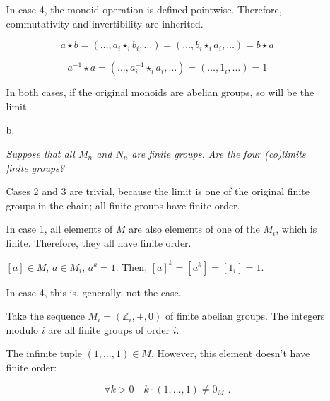 \documentclass[a4paper,notitlepage]{article}
\begin{document}
\begin{enumerate}
\begin{enumerate}
         In case 4, the monoid operation is defined pointwise.
         Therefore, commutativity and invertibility are inherited.

         $$a \star b = (…, a_i \star_i b_i, …) = (…, b_i \star_i a_i, …) = b \star a$$
         
         $$a^{-1} \star a = (…, a_i^{-1} \star_i a_i, …) = (…, 1_i, …) = 1$$

         In both cases, if the original monoids are abelian groups, so
         will be the limit.

       \item[b.]

         {\em Suppose that all $M_n$ and $N_n$ are finite groups.
           Are the four (co)limits finite groups?}

         Cases 2 and 3 are trivial, because the limit is one of the
         original finite groups in the chain; all finite groups have
         finite order.

         In case 1, all elements of $M$ are also elements of one of the
         $M_i$, which is finite. Therefore, they all have finite order.

         $[a] \in M$, $a \in M_i$, $a^k = 1$. Then, $[a]^k = \left [ a^k \right ] = \left [ 1_i \right ] = 1$.

         In case 4, this is, generally, not the case.

         Take the sequence $M_i = (\mathbb{Z}_{i},+,0)$ of finite abelian
         groups. The integers modulo ${i}$ are all finite groups of
         order $i$.

         The infinite tuple $(1, …, 1) \in M$. However, this element
         doesn't have finite order:
         
         $$\forall k > 0 \quad k·(1, …, 1) \neq 0_M \text{ .}$$
         
         
     \end{enumerate}

\end{enumerate}
\end{document}
